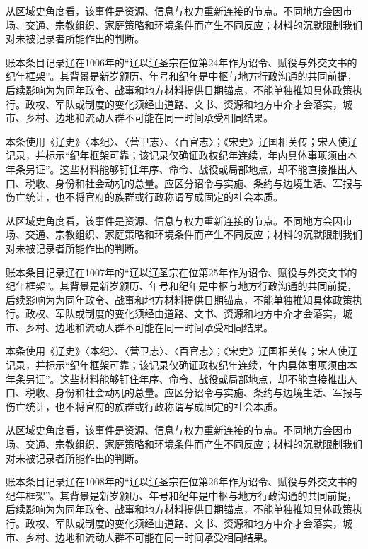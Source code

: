 从区域史角度看，该事件是资源、信息与权力重新连接的节点。不同地方会因市场、交通、宗教组织、家庭策略和环境条件而产生不同反应；材料的沉默限制我们对未被记录者所能作出的判断。

账本条目记录辽在1006年的“辽以辽圣宗在位第24年作为诏令、赋役与外交文书的纪年框架”。其背景是新岁颁历、年号和纪年是中枢与地方行政沟通的共同前提，后续影响为为同年政令、战事和地方材料提供日期锚点，不能单独推知具体政策执行。政权、军队或制度的变化须经由道路、文书、资源和地方中介才会落实，城市、乡村、边地和流动人群不可能在同一时间承受相同结果。

本条使用《辽史》〈本纪〉、〈营卫志〉、〈百官志〉；《宋史》辽国相关传；宋人使辽记录，并标示“纪年框架可靠；该记录仅确证政权纪年连续，年内具体事项须由本年条另证”。这些材料能够钉住年序、命令、战役或局部地点，却不能直接推出人口、税收、身份和社会动机的总量。应区分诏令与实施、条约与边境生活、军报与伤亡统计，也不将官府的族群或行政称谓写成固定的社会本质。

从区域史角度看，该事件是资源、信息与权力重新连接的节点。不同地方会因市场、交通、宗教组织、家庭策略和环境条件而产生不同反应；材料的沉默限制我们对未被记录者所能作出的判断。

账本条目记录辽在1007年的“辽以辽圣宗在位第25年作为诏令、赋役与外交文书的纪年框架”。其背景是新岁颁历、年号和纪年是中枢与地方行政沟通的共同前提，后续影响为为同年政令、战事和地方材料提供日期锚点，不能单独推知具体政策执行。政权、军队或制度的变化须经由道路、文书、资源和地方中介才会落实，城市、乡村、边地和流动人群不可能在同一时间承受相同结果。

本条使用《辽史》〈本纪〉、〈营卫志〉、〈百官志〉；《宋史》辽国相关传；宋人使辽记录，并标示“纪年框架可靠；该记录仅确证政权纪年连续，年内具体事项须由本年条另证”。这些材料能够钉住年序、命令、战役或局部地点，却不能直接推出人口、税收、身份和社会动机的总量。应区分诏令与实施、条约与边境生活、军报与伤亡统计，也不将官府的族群或行政称谓写成固定的社会本质。

从区域史角度看，该事件是资源、信息与权力重新连接的节点。不同地方会因市场、交通、宗教组织、家庭策略和环境条件而产生不同反应；材料的沉默限制我们对未被记录者所能作出的判断。

账本条目记录辽在1008年的“辽以辽圣宗在位第26年作为诏令、赋役与外交文书的纪年框架”。其背景是新岁颁历、年号和纪年是中枢与地方行政沟通的共同前提，后续影响为为同年政令、战事和地方材料提供日期锚点，不能单独推知具体政策执行。政权、军队或制度的变化须经由道路、文书、资源和地方中介才会落实，城市、乡村、边地和流动人群不可能在同一时间承受相同结果。

